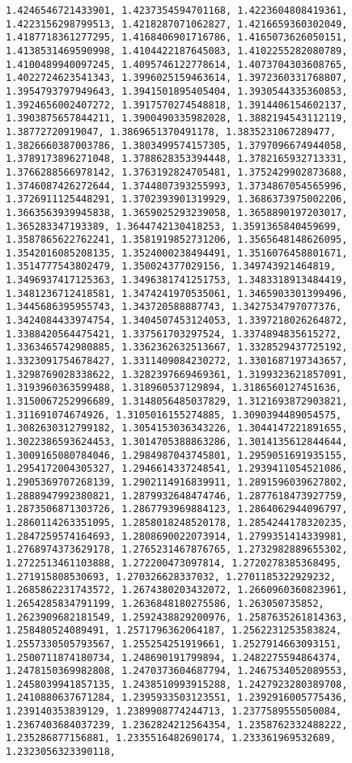 \documentclass[11pt]{article}
\begin{document}
\begin{Verbatim}[commandchars=\\\{\}]
1.4246546721433901, 1.4237354594701168, 1.4223604808419361, 1.4223156298799513, 1.4218287071062827, 1.4216659360302049, 1.4187718361277295, 1.4168406901716786, 1.4165073626050151, 1.4138531469590998, 1.4104422187645083, 1.4102255282080789, 1.4100489940097245, 1.4095746122778614, 1.4073704303608765, 1.4022724623541343, 1.3996025159463614, 1.3972360331768807, 1.3954793797949643, 1.3941501895405404, 1.3930544335360853, 1.3924656002407272, 1.3917570274548818, 1.3914406154602137, 1.3903875657844211, 1.3900490335982028, 1.3882194543112119, 1.38772720919047, 1.3869651370491178, 1.3835231067289477, 1.3826660387003786, 1.3803499574157305, 1.3797096674944058, 1.3789173896271048, 1.3788628353394448, 1.3782165932713331, 1.3766288566978142, 1.3763192824705481, 1.3752429902873688, 1.3746087426272644, 1.3744807393255993, 1.3734867054565996, 1.3726911125448291, 1.3702393901319929, 1.3686373975002206, 1.3663563939945838, 1.3659025293239058, 1.3658890197203017, 1.365283347193389, 1.3644742130418253, 1.3591365840459699, 1.3587865622762241, 1.3581919852731206, 1.3565648148626095, 1.3542016085208135, 1.3524000238494491, 1.3516076458801671, 1.3514777543802479, 1.350024377029156, 1.349743921464819, 1.3496937417125363, 1.3496381741251753, 1.3483318913484419, 1.3481236712418581, 1.3474241970535061, 1.3465903301399496, 1.3445686395955743, 1.343720588887743, 1.3427534797077376, 1.3424084433974754, 1.3404507453124053, 1.3397218026264872, 1.3388420564475421, 1.337561703297524, 1.3374894835615272, 1.3363465742980885, 1.3362362632513667, 1.3328529437725192, 1.3323091754678427, 1.3311409084230272, 1.3301687197343657, 1.3298769028338622, 1.3282397669469361, 1.3199323621857091, 1.3193960363599488, 1.318960537129894, 1.3186560127451636, 1.3150067252996689, 1.3148056485037829, 1.3121693872903821, 1.311691074674926, 1.3105016155274885, 1.3090394489054575, 1.3082630312799182, 1.3054153036343226, 1.3044147221891655, 1.3022386593624453, 1.3014705388863286, 1.3014135612844644, 1.3009165080784046, 1.2984987043745801, 1.2959051691935155, 1.2954172004305327, 1.2946614337248541, 1.2939411054521086, 1.2905369707268139, 1.2902114916839911, 1.2891596039627802, 1.2888947992380821, 1.2879932648474746, 1.2877618473927759, 1.2873506871303726, 1.2867793969884123, 1.2864062944096797, 1.2860114263351095, 1.2858018248520178, 1.2854244178320235, 1.2847259574164693, 1.2808690022073914, 1.2799351414339981, 1.2768974373629178, 1.2765231467876765, 1.2732982889655302, 1.2722513461103888, 1.272200473097814, 1.2720278385368495, 1.271915808530693, 1.270326628337032, 1.2701185322929232, 1.2685862231743572, 1.2674380203432072, 1.2660960360823961, 1.2654285834791199, 1.2636848180275586, 1.263050735852, 1.2623909682181549, 1.2592438829200976, 1.2587635261814363, 1.258480524089491, 1.2571796362064187, 1.2562231253583824, 1.2557330505793567, 1.255254251919661, 1.2527914663093151, 1.2500711874180734, 1.248690191799894, 1.2482275594864374, 1.2478150369982808, 1.2470373604687794, 1.2467534052089553, 1.2458039941857135, 1.2438510993915288, 1.2427923280389708, 1.2410880637671284, 1.2395933503123551, 1.2392916005775436, 1.239140353839129, 1.2389908774244713, 1.2377589555050084, 1.2367403684037239, 1.2362824212564354, 1.2358762332488222, 1.235286877156881, 1.2335516482690174, 1.233361969532689, 1.2323056323390118, 
\end{Verbatim}
\end{document}
